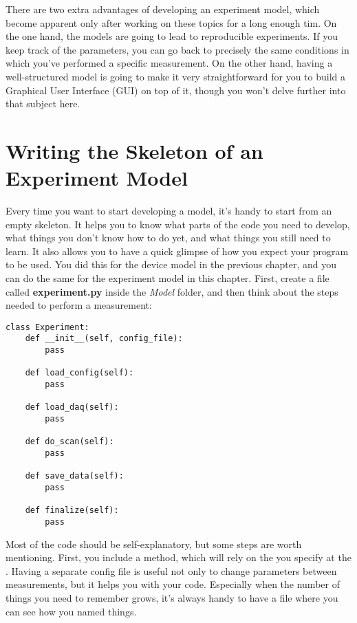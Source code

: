 There are two extra advantages of developing an experiment model, which become apparent only after working on these topics for a long enough tim. On the one hand, the models are going to lead to reproducible experiments. If you keep track of the parameters, you can go back to precisely the same conditions in which you've performed a specific measurement. On the other hand, having a well-structured model is going to make it very straightforward for you to build a Graphical User Interface ({GUI}) on top of it, though you won't delve further into that subject here.

\section{Writing the Skeleton of an Experiment Model}\label{sec:skeleton-experiment-model}
Every time you want to start developing a model, it's handy to start from an empty skeleton. It helps you to know what parts of the code you need to develop, what things you don't know how to do yet, and what things you still need to learn. It also allows you to have a quick glimpse of how you expect your program to be used. You did this for the device model in the previous chapter, and you can do the same for the experiment model in this chapter. First, create a file called \textbf{experiment.py} inside the \emph{Model} folder, and then think about the steps needed to perform a measurement:

\begin{verbatim}
class Experiment:
    def __init__(self, config_file):
        pass

    def load_config(self):
        pass

    def load_daq(self):
        pass

    def do_scan(self):
        pass

    def save_data(self):
        pass

    def finalize(self):
        pass

\end{verbatim}

Most of the code should be self-explanatory, but some steps are worth mentioning. First, you include a  method, which will rely on the  you specify at the . Having a separate config file is useful not only to change parameters between measurements, but it helps you with your code. Especially when the number of things you need to remember grows, it's always handy to have a file where you can see how you named things.

